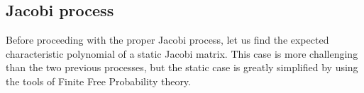 \subsection{Jacobi process}

Before proceeding with the proper Jacobi process, let us find the expected characteristic polynomial of a static Jacobi matrix. This case is more challenging than the two previous processes, but the static case is greatly simplified by using the tools of Finite Free Probability theory. 












